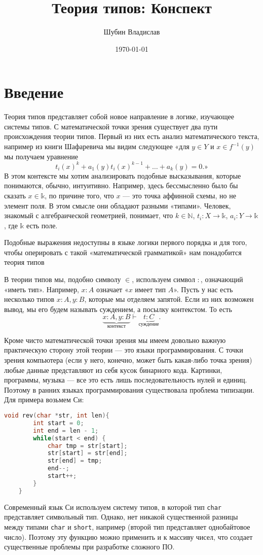 \documentclass[openany]{book}
\date{\today}
\author{Шубин Владислав}
\title{Теория типов: Конспект}
\theoremstyle{plain}
\theoremstyle{definition}
\newcommand{\N}{\mathbb{N}}
\begin{document}
\maketitle
\tableofcontents

\chapter{Введение}
Теория типов представляет собой новое направление в логике, изучающее системы типов. С математической точки зрения существует два пути происхождения теории типов. Первый из них есть анализ математического текста, например из книги Шафаревича \cite{Shaph} мы видим следующее «для \(y \in Y\) и \(x \in f^{-1}(y)\) мы получаем уравнение \[t_i(x)^k + a_1(y)t_i(x)^{k-1}+\dots+a_k(y) = 0.\text{»}\]В этом контексте мы хотим анализировать подобные высказывания, которые понимаются, обычно, интуитивно. Например, здесь бессмысленно было бы сказать \(x \in \mathbb{k}\), по причине того, что \(x\) --- это точка аффинной схемы, но не элемент поля. В этом смысле они обладают разными «типами». Человек, знакомый с алгебраической геометрией, понимает, что \(k \in \N\), \(t_i : X \to \mathbb{k}\), \(a_i : Y \to \mathbb{k}\), где \(\mathbb{k}\) есть поле.

Подобные выражения недоступны в языке логики первого порядка и для того, чтобы оперировать с такой «математической грамматикой» нам понадобится теория типов

В теории типов мы, подобно символу \(\in\), используем символ \(:\), означающий «иметь тип». Например, \(x : A\) означает «\(x\) имеет тип \(A\)». Пусть у нас есть несколько типов \(x : A, y : B\), которые мы отделяем запятой. Если из них возможен вывод, мы его будем называть суждением, а посылку контекстом. То есть \[\underbrace{x : A, y : B}_{\text{контекст}} \vdash \underbrace{t : C}_{\text{суждение}}.\]

Кроме чисто математической точки зрения мы имеем довольно важную практическую сторону этой теории --- это языки программирования. С точки зрения компьютера (если у него, конечно, может быть какая-либо точка зрения) любые данные представляют из себя кусок бинарного кода. Картинки, программы, музыка --- все это есть лишь последовательность нулей и единиц. Поэтому в ранних языках программирования существовала проблема типизации. Для примера возьмем Си:
\begin{lstlisting}[language=C]
    void rev(char *str, int len){
        int start = 0;
        int end = len - 1;
        while(start < end) {
            char tmp = str[start];
            str[start] = str[end];
            str[end] = tmp;
            end--;
            start++;
        }
    }
\end{lstlisting}
Современный язык Си используем систему типов, в которой тип \texttt{char} представляет символьный тип. Однако, нет никакой существенной разницы между типами \texttt{char} и \texttt{short}, например (второй тип представляет однобайтовое число). Поэтому эту функцию можно применить и к массиву чисел, что создает существенные проблемы при разработке сложного ПО.
\end{document}
